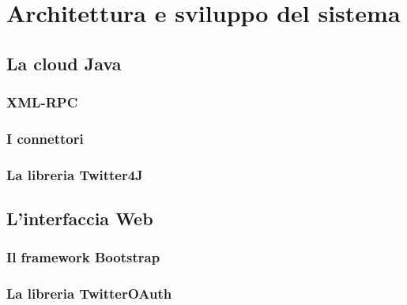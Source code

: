 \chapter{Architettura e sviluppo del sistema}



\section{La cloud Java}

\subsection{XML-RPC}
\subsection{I connettori}
\subsection{La libreria Twitter4J}

\section{L'interfaccia Web}

\subsection{Il framework Bootstrap}
\subsection{La libreria TwitterOAuth}

